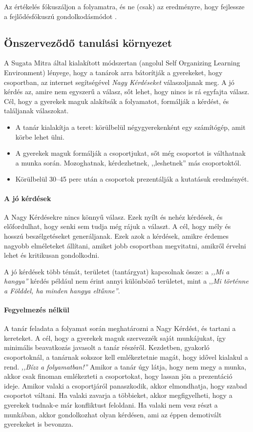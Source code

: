 Az értékelés fókuszáljon a folyamatra, és ne (csak)  az eredményre, hogy fejlessze a fejlődésfókuszú gondolkodásmódot \citep{growthmindset}.

\subsection{Önszerveződő tanulási környezet}
A Sugata Mitra által kialakított módszertan (angolul Self Organizing Learning Environment) lényege, hogy a tanárok arra bátorítják a gyerekeket, hogy csoportban, az internet segítségével \emph{Nagy Kérdéseket} válaszoljanak meg. A jó kérdés az, amire nem egyszerű a válasz, sőt lehet, hogy nincs is rá egyfajta válasz. Cél, hogy a gyerekek maguk alakítsák a folyamatot, formálják a kérdést, és találjanak válaszokat.

\begin{itemize}
      \item A tanár kialakítja a teret: körülbelül négygyerekenként egy számítógép, amit körbe lehet ülni.
      \item A gyerekek maguk formálják a csoportjukat, sőt még csoportot is válthatnak a munka során. Mozoghatnak, kérdezhetnek, ,,leshetnek''
más csoportoktól.
      \item Körülbelül 30--45 perc után a csoportok prezentálják a kutatásuk eredményét.
\end{itemize}

\paragraph{A jó kérdések}
A Nagy Kérdésekre nincs könnyű válasz. Ezek nyílt és nehéz kérdések, és előfordulhat, hogy senki sem tudja még rájuk a választ. A cél, hogy mély és hosszú beszélgetéseket generáljanak. Ezek azok a kérdések, amikre érdemes nagyobb elméleteket állítani, amiket jobb csoportban megvitatni, amikről érvelni lehet és kritikusan gondolkodni.

A jó kérdések több témát, területet (tantárgyat) kapcsolnak össze: a \emph{,,Mi a
      hangya''} kérdés például nem érint annyi különböző területet, mint a ,\emph{,Mi
      történne a Földdel, ha minden hangya eltűnne''}.

\paragraph{Fegyelmezés nélkül}
A tanár feladata a folyamat során meghatározni a Nagy Kérdést, és tartani a kereteket. A cél, hogy a gyerekek maguk szervezzék saját munkájukat, így minimális beavatkozás javasolt a tanár részéről. Kezdetben, gyakorló csoportoknál, a tanárnak sokszor kell emlékeztetnie magát, hogy idővel kialakul a rend. \emph{,,Bízz a
      folyamatban!''
} Amikor a tanár úgy látja, hogy nem megy a munka, akkor csak finoman emlékezteti a csoportokat, hogy lassan jön a prezentáció ideje. Amikor valaki a csoportjáról panaszkodik, akkor elmondhatja, hogy szabad csoportot váltani. Ha valaki zavarja a többieket, akkor megfigyelheti, hogy a gyerekek tudnak-e már konfliktust feloldani. Ha valaki nem vesz részt a munkában, akkor gondolkozhat olyan kérdésen, ami az éppen demotivált gyerekeket is bevonzza.

